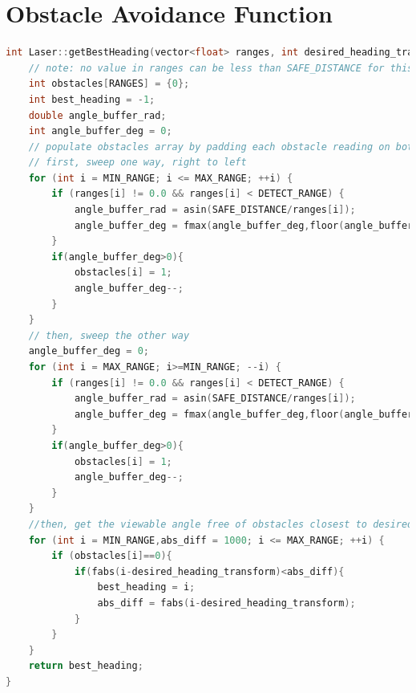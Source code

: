 \documentclass[titlepage,12pt,a4paper]{article}
\begin{document}
\section{Obstacle Avoidance Function}
\label{appendix:obstacle_avoidance}
\begin{lstlisting}[language=C++]
int Laser::getBestHeading(vector<float> ranges, int desired_heading_transform) const {
	// note: no value in ranges can be less than SAFE_DISTANCE for this function to work
	int obstacles[RANGES] = {0};
	int best_heading = -1;
	double angle_buffer_rad;
	int angle_buffer_deg = 0;
	// populate obstacles array by padding each obstacle reading on both sides
	// first, sweep one way, right to left
	for (int i = MIN_RANGE; i <= MAX_RANGE; ++i) {
		if (ranges[i] != 0.0 && ranges[i] < DETECT_RANGE) {
			angle_buffer_rad = asin(SAFE_DISTANCE/ranges[i]);
			angle_buffer_deg = fmax(angle_buffer_deg,floor(angle_buffer_rad * 180/M_PI));
		}
		if(angle_buffer_deg>0){
			obstacles[i] = 1;
			angle_buffer_deg--;
		}
	}
	// then, sweep the other way
	angle_buffer_deg = 0;
	for (int i = MAX_RANGE; i>=MIN_RANGE; --i) {
		if (ranges[i] != 0.0 && ranges[i] < DETECT_RANGE) {
			angle_buffer_rad = asin(SAFE_DISTANCE/ranges[i]);
			angle_buffer_deg = fmax(angle_buffer_deg,floor(angle_buffer_rad * 180/M_PI));
		}
		if(angle_buffer_deg>0){
			obstacles[i] = 1;
			angle_buffer_deg--;
		}
	}
	//then, get the viewable angle free of obstacles closest to desired heading
	for (int i = MIN_RANGE,abs_diff = 1000; i <= MAX_RANGE; ++i) {
		if (obstacles[i]==0){
			if(fabs(i-desired_heading_transform)<abs_diff){
				best_heading = i;
				abs_diff = fabs(i-desired_heading_transform);
			}
		}
	}
	return best_heading;
}
\end{lstlisting}
\end{document}
